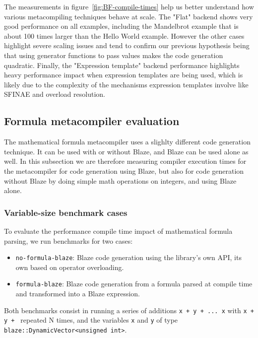 \documentclass[../main]{subfiles}
\begin{document}
The measurements in figure~\ref{fig:BF-compile-times} help us better understand
how various metacompiling techniques behave at scale. The "Flat" backend shows
very good performance on all examples, including the Mandelbrot example that is
about 100 times larger than the Hello World example. However the other cases
highlight severe scaling issues and tend to confirm our previous hypothesis
being that using generator functions to pass values makes the code generation
quadratic. Finally, the "Expression template" backend performance highlights
heavy performance impact when expression templates are being used, which is
likely due to the complexity of the mechanisms expression templates involve like
SFINAE and overload resolution.

\subsection{Formula metacompiler evaluation}

The mathematical formula metacompiler uses a slighlty different code generation
technique. It can be used with or without Blaze, and Blaze can be used alone as
well. In this subsection we are therefore measuring compiler execution times for
the metacompiler for code generation using Blaze, but also for code generation
without Blaze by doing simple math operations on integers, and using Blaze
alone.

\subsubsection{Variable-size benchmark cases}

To evaluate the performance compile time impact of mathematical formula parsing,
we run benchmarks for two cases:

\begin{itemize}
\item \lstinline{no-formula-blaze}: Blaze code generation using the library's
      own API, \ie its own \dsel based on \cpp operator overloading.
\item \lstinline{formula-blaze}: Blaze code generation from a formula parsed at
      compile time and transformed into a Blaze expression.
\end{itemize}

Both benchmarks consist in running a series of additions
\lstinline{x + y + ... x} with \lstinline{x + y + } repeated N times, and the
variables \lstinline{x} and \lstinline{y} of type
\lstinline{blaze::DynamicVector<unsigned int>}.
\end{document}
